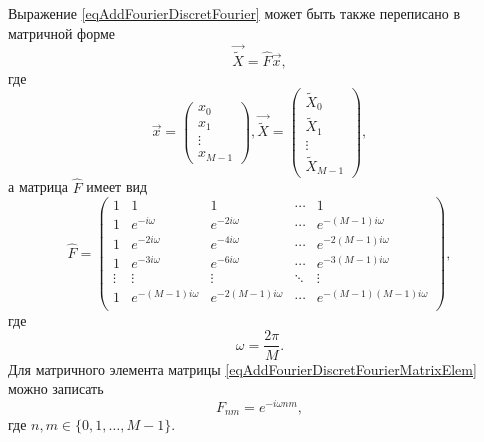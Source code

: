Выражение \eqref{eqAddFourierDiscretFourier} может быть также
переписано в матричной форме
\begin{equation}
\vec{\tilde{X}} = \hat{F} \vec{x},
\nonumber
\end{equation}
где
\begin{equation}
\vec{x} = 
\left(
\begin{array}{c}
x_0 \\
x_1 \\
\vdots \\
x_{M-1}
\end{array}
\right)
,
\vec{\tilde{X}} = 
\left(
\begin{array}{c}
\tilde{X}_0 \\
\tilde{X}_1 \\
\vdots \\
\tilde{X}_{M-1}
\end{array}
\right)
,
\nonumber
\end{equation}
а матрица $\hat{F}$ имеет вид
\begin{equation}
\hat{F} = 
\begin{pmatrix}
1 & 1 & 1 & \cdots & 1 \\
1 & e^{-i \omega} & e^{-2 i \omega} & \cdots & 
e^{-\left( M - 1 \right) i \omega} \\
1 & e^{-2 i \omega} & e^{-4 i \omega} & \cdots & 
e^{-2 \left( M - 1 \right) i \omega} \\
1 & e^{-3 i \omega} & e^{-6 i \omega} & \cdots & 
e^{-3 \left( M - 1 \right) i \omega} \\
\vdots & \vdots & \vdots & \ddots & \vdots \\
1 & e^{-\left( M - 1 \right) i \omega} & e^{-2\left( M - 1 \right) i \omega} & \cdots & 
e^{- \left( M - 1 \right)\left( M - 1 \right) i \omega} \\
\end{pmatrix}
,
\label{eqAddFourierDiscretFourierMatrixElem}
\end{equation}
где
\[
\omega = \frac{2 \pi}{M}.
\]
Для матричного элемента матрицы
\eqref{eqAddFourierDiscretFourierMatrixElem} можно записать
\begin{equation}
F_{n m} = e^{-i \omega n m},
\label{eqAddFourierDiscretFourierMatrixElem2}
\end{equation}
где $n, m \in \{ 0, 1, \dots, M - 1\}$.
